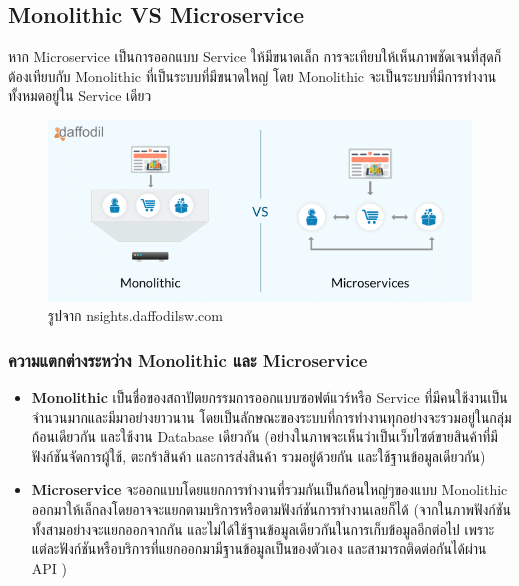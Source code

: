 \subsection{Monolithic VS Microservice}
\hspace{1.27cm}หาก Microservice เป็นการออกแบบ Service ให้มีขนาดเล็ก การจะเทียบให้เห็นภาพชัดเจนที่สุดก็ต้องเทียบกับ Monolithic ที่เป็นระบบที่มีขนาดใหญ่ โดย Monolithic จะเป็นระบบที่มีการทำงานทั้งหมดอยู่ใน Service เดียว
\begin{figure}[H] %
  \centering
  \includegraphics[width=\linewidth, keepaspectratio]{pictures/monolithic-vs-microservices.png}
  \caption[Monolithic Vs Microservice]{รูปจาก nsights.daffodilsw.com}
\end{figure}


\subsubsection{ความแตกต่างระหว่าง Monolithic และ Microservice}
\begin{itemize}
  \item \textbf{Monolithic} เป็นชื่อของสถาปัตยกรรมการออกแบบซอฟต์แวร์หรือ Service ที่มีคนใช้งานเป็นจำนวนมากและมีมาอย่างยาวนาน โดยเป็นลักษณะของระบบที่การทำงานทุกอย่างจะรวมอยู่ในกลุ่มก้อนเดียวกัน และใช้งาน Database เดียวกัน (อย่างในภาพจะเห็นว่าเป็นเว็บไซต์ขายสินค้าที่มีฟังก์ชันจัดการผู้ใช้, ตะกร้าสินค้า และการส่งสินค้า รวมอยู่ด้วยกัน และใช้ฐานข้อมูลเดียวกัน)
  \item \textbf{Microservice}  จะออกแบบโดยแยกการทำงานที่รวมกันเป็นก้อนใหญ่ๆของแบบ Monolithic ออกมาให้เล็กลงโดยอาจจะแยกตามบริการหรือตามฟังก์ชันการทำงานเลยก็ได้ (จากในภาพฟังก์ชันทั้งสามอย่างจะแยกออกจากกัน และไม่ได้ใช้ฐานข้อมูลเดียวกันในการเก็บข้อมูลอีกต่อไป เพราะแต่ละฟังก์ชันหรือบริการที่แยกออกมามีฐานข้อมูลเป็นของตัวเอง และสามารถติดต่อกันได้ผ่าน API )
\end{itemize}




